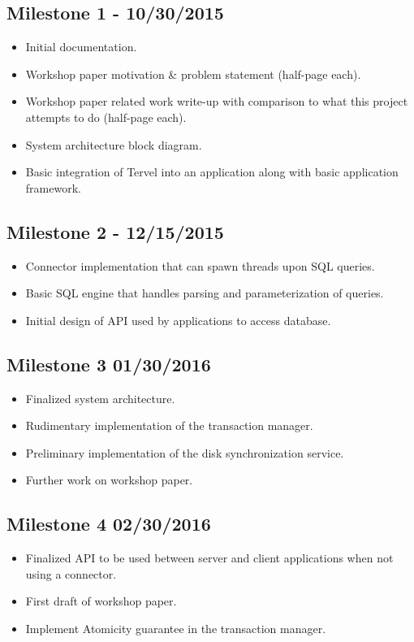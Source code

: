 \documentclass[letterpaper]{article}
\begin{document}
  \subsection{Milestone 1 - 10/30/2015}
  \begin{itemize}
   \item Initial documentation.
   \item Workshop paper motivation \& problem statement (half-page each).
   \item Workshop paper related work write-up with comparison to what this project attempts to do (half-page each).
   \item System architecture block diagram.
   \item Basic integration of Tervel into an application along with basic application framework.
  \end{itemize}
  \subsection{Milestone 2 - 12/15/2015}
  \begin{itemize}
   \item Connector implementation that can spawn threads upon SQL queries.
   \item Basic SQL engine that handles parsing and parameterization of queries.
   \item Initial design of API used by applications to access database.
  \end{itemize}
  \subsection{Milestone 3 01/30/2016}
  \begin{itemize}
   \item Finalized system architecture.
   \item Rudimentary implementation of the transaction manager.
   \item Preliminary implementation of the disk synchronization service.
   \item Further work on workshop paper.
  \end{itemize}
  \subsection{Milestone 4 02/30/2016}
  \begin{itemize}
   \item Finalized API to be used between server and client applications when not using a connector.
   \item First draft of workshop paper.
   \item Implement Atomicity guarantee in the transaction manager.
  \end{itemize}
\end{document}
